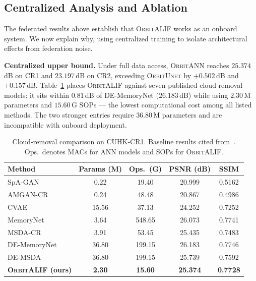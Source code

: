 \documentclass[conference]{IEEEtran}
\newcommand{\OrbitALIF}{\textsc{OrbitALIF}}
\newcommand{\OrbitANN}{\textsc{OrbitANN}}
\newcommand{\OrbitUnet}{\textsc{OrbitUnet}}
\begin{document}
\subsection{Centralized Analysis and Ablation}
\label{sec:exp-ablation}

The federated results above establish that \OrbitALIF{} works as an
onboard system. We now explain why, using centralized training to
isolate architectural effects from federation noise.

\noindent\textbf{Centralized upper bound.}
Under full data access, \OrbitANN{} reaches $25.374$\,dB on
CR1 and $23.197$\,dB on CR2, exceeding \OrbitUnet{} by $+0.502$\,dB
and $+0.157$\,dB. Table~\ref{tab:cr1} places \OrbitALIF{} against
seven published cloud-removal models: it sits within $0.81$\,dB of
DE-MemoryNet ($26.183$\,dB) while using $2.30$\,M parameters and
$15.60$\,G SOPs — the lowest computational cost among all listed
methods. The two stronger entries require $36.80$\,M parameters and
are incompatible with onboard deployment.

\begin{table}[!t]
\centering
\caption{Cloud-removal comparison on CUHK-CR1. Baseline results
cited from~\cite{ref:cuhkcr}. Ops.\ denotes MACs for ANN models
and SOPs for \OrbitALIF{}.}
\label{tab:cr1}
\setlength{\tabcolsep}{4pt}
\footnotesize
\begin{tabular}{lcccc}
\toprule
Method & Params (M) & Ops.\ (G) & PSNR (dB) & SSIM \\
\midrule
SpA-GAN~\cite{ref:cuhkcr}      & 0.22  & 19.40  & 20.999 & 0.5162 \\
AMGAN-CR~\cite{ref:cuhkcr}     & 0.24  & 48.48  & 20.867 & 0.4986 \\
CVAE~\cite{ref:cuhkcr}         & 15.56 & 37.13  & 24.252 & 0.7252 \\
MemoryNet~\cite{ref:cuhkcr}    & 3.64  & 548.65 & 26.073 & 0.7741 \\
MSDA-CR~\cite{ref:cuhkcr}      & 3.91  & 53.45  & 25.435 & 0.7483 \\
DE-MemoryNet~\cite{ref:cuhkcr} & 36.80 & 199.15 & 26.183 & 0.7746 \\
DE-MSDA~\cite{ref:cuhkcr}      & 36.80 & 199.15 & 25.739 & 0.7592 \\
\midrule
\textbf{\OrbitALIF{} (ours)}
  & \textbf{2.30} & \textbf{15.60}
  & \textbf{25.374} & \textbf{0.7728} \\
\bottomrule
\end{tabular}
\end{table}
\end{document}
